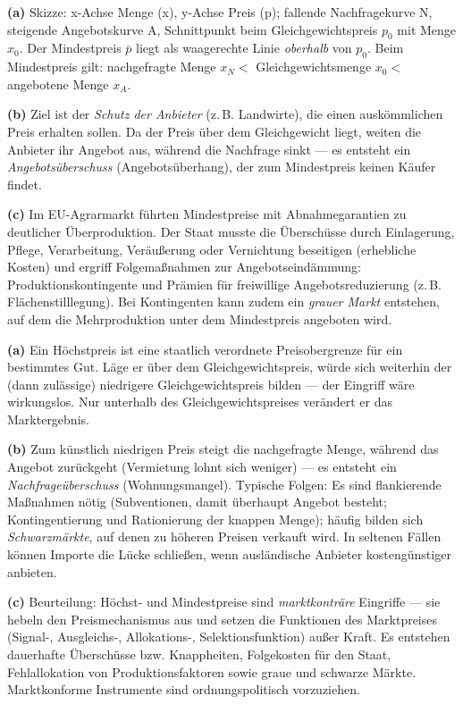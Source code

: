 \documentclass[11pt, a4paper]{article}
\begin{document}
\begin{loesung}[title={Lösung Aufgabe~4 --- Mindestpreis}]
\textbf{(a)} Skizze: x-Achse Menge (x), y-Achse Preis (p); fallende Nachfragekurve N,
steigende Angebotskurve A, Schnittpunkt beim Gleichgewichtspreis $p_0$ mit Menge $x_0$.
Der Mindestpreis $\bar{p}$ liegt als waagerechte Linie \emph{oberhalb} von $p_0$. Beim
Mindestpreis gilt: nachgefragte Menge $x_N <$ Gleichgewichtsmenge $x_0 <$ angebotene
Menge $x_A$.

\textbf{(b)} Ziel ist der \emph{Schutz der Anbieter} (z.\,B. Landwirte), die einen
auskömmlichen Preis erhalten sollen. Da der Preis über dem Gleichgewicht liegt, weiten
die Anbieter ihr Angebot aus, während die Nachfrage sinkt --- es entsteht ein
\emph{Angebotsüberschuss} (Angebotsüberhang), der zum Mindestpreis keinen Käufer findet.

\textbf{(c)} Im EU-Agrarmarkt führten Mindestpreise mit Abnahmegarantien zu deutlicher
Überproduktion. Der Staat musste die Überschüsse durch Einlagerung, Pflege, Verarbeitung,
Veräußerung oder Vernichtung beseitigen (erhebliche Kosten) und ergriff Folgemaßnahmen
zur Angebotseindämmung: Produktionskontingente und Prämien für freiwillige
Angebotsreduzierung (z.\,B. Flächenstilllegung). Bei Kontingenten kann zudem ein
\emph{grauer Markt} entstehen, auf dem die Mehrproduktion unter dem Mindestpreis
angeboten wird.
\end{loesung}

\begin{loesung}[title={Lösung Aufgabe~5 --- Höchstpreis und Beurteilung}]
\textbf{(a)} Ein Höchstpreis ist eine staatlich verordnete Preisobergrenze für ein
bestimmtes Gut. Läge er über dem Gleichgewichtspreis, würde sich weiterhin der (dann
zulässige) niedrigere Gleichgewichtspreis bilden --- der Eingriff wäre wirkungslos. Nur
unterhalb des Gleichgewichtspreises verändert er das Marktergebnis.

\textbf{(b)} Zum künstlich niedrigen Preis steigt die nachgefragte Menge, während das
Angebot zurückgeht (Vermietung lohnt sich weniger) --- es entsteht ein
\emph{Nachfrageüberschuss} (Wohnungsmangel). Typische Folgen: Es sind flankierende
Maßnahmen nötig (Subventionen, damit überhaupt Angebot besteht; Kontingentierung und
Rationierung der knappen Menge); häufig bilden sich \emph{Schwarzmärkte}, auf denen zu
höheren Preisen verkauft wird. In seltenen Fällen können Importe die Lücke schließen,
wenn ausländische Anbieter kostengünstiger anbieten.

\textbf{(c)} Beurteilung: Höchst- und Mindestpreise sind \emph{marktkonträre} Eingriffe
--- sie hebeln den Preismechanismus aus und setzen die Funktionen des Marktpreises
(Signal-, Ausgleichs-, Allokations-, Selektionsfunktion) außer Kraft. Es entstehen
dauerhafte Überschüsse bzw. Knappheiten, Folgekosten für den Staat, Fehlallokation von
Produktionsfaktoren sowie graue und schwarze Märkte. Marktkonforme Instrumente sind
ordnungspolitisch vorzuziehen.
\end{loesung}
\end{document}
